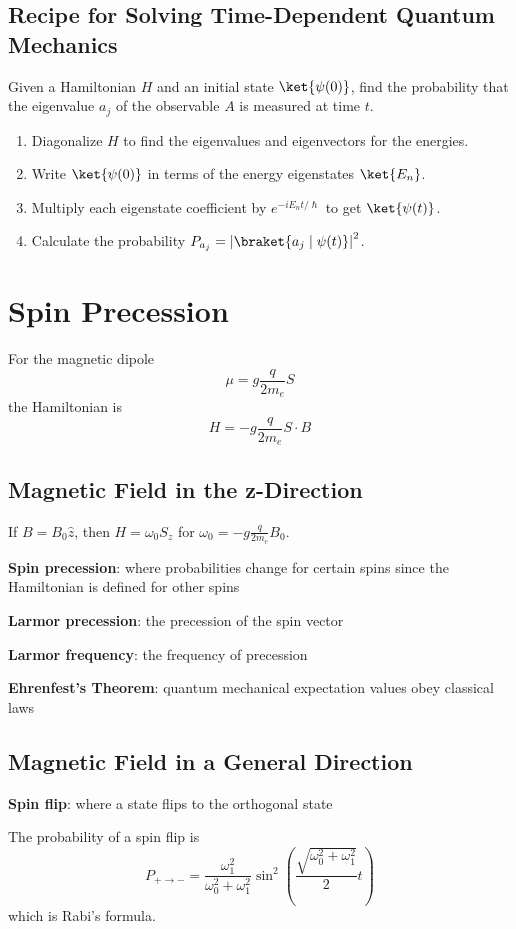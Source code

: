 \documentclass[11pt]{article}
\begin{document}
\subsection{Recipe for Solving Time-Dependent Quantum Mechanics}
\label{sec:org432f06e}
Given a Hamiltonian \(H\) and an initial state \(\ket{\psi(0)}\), find the probability that
the eigenvalue \(a_{j}\) of the observable \(A\) is measured at time \(t\).
\begin{enumerate}
\item Diagonalize \(H\) to find the eigenvalues and eigenvectors for the energies.
\item Write \(\ket{\psi(0)}\) in terms of the energy eigenstates \(\ket{E_{n}}\).
\item Multiply each eigenstate coefficient by \(e^{-iE_{n}t/\hslash}\) to get \(\ket{\psi(t)}\).
\item Calculate the probability \(P_{a_{j}} = \left| \braket{a_{j} \mid \psi(t)} \right|^{2}\).
\end{enumerate}
\section{Spin Precession}
\label{sec:org465994a}
For the magnetic dipole
$$
\mu = g \frac{q}{2m_{e}} S
$$
the Hamiltonian is
$$
H = -g \frac{q}{2m_{e}} S \cdot B
$$
\subsection{Magnetic Field in the z-Direction}
\label{sec:orgc95d80c}
If \(B = B_{0} \hat{z}\), then \(H = \omega_{0} S_{z}\)
for \(\omega_{0} = -g\frac{q}{2m_{e}} B_{0}\).

\textbf{Spin precession}: where probabilities change for certain spins since the Hamiltonian
is defined for other spins

\textbf{Larmor precession}: the precession of the spin vector

\textbf{Larmor frequency}: the frequency of precession

\textbf{Ehrenfest's Theorem}: quantum mechanical expectation values obey classical laws
\subsection{Magnetic Field in a General Direction}
\label{sec:org46d9eb6}
\textbf{Spin flip}: where a state flips to the orthogonal state

The probability of a spin flip is
$$
P_{+ \to -} = \frac{\omega_{1}^{2}}{\omega_{0}^{2} + \omega_{1}^{2}}
\sin^{2} \left( \frac{\sqrt{\omega_{0}^{2} + \omega_{1}^{2}}}{2} t \right)
$$
which is Rabi's formula.
\end{document}
